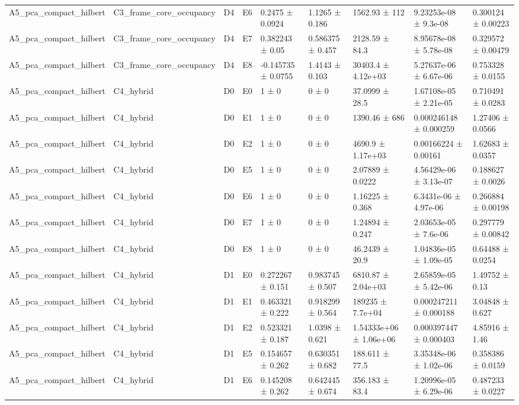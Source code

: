 \begin{table}
\begin{tabular}{lllllllll}
A5\_pca\_compact\_hilbert & C3\_frame\_core\_occupancy & D4 & E6 & 0.2475 ± 0.0924 & 1.1265 ± 0.186 & 1562.93 ± 112 & 9.23253e-08 ± 9.3e-08 & 0.300124 ± 0.00223 \\
A5\_pca\_compact\_hilbert & C3\_frame\_core\_occupancy & D4 & E7 & 0.382243 ± 0.05 & 0.586375 ± 0.457 & 2128.59 ± 84.3 & 8.95678e-08 ± 5.78e-08 & 0.329572 ± 0.00479 \\
A5\_pca\_compact\_hilbert & C3\_frame\_core\_occupancy & D4 & E8 & -0.145735 ± 0.0755 & 1.4143 ± 0.103 & 30403.4 ± 4.12e+03 & 5.27637e-06 ± 6.67e-06 & 0.753328 ± 0.0155 \\
A5\_pca\_compact\_hilbert & C4\_hybrid & D0 & E0 & 1 ± 0 & 0 ± 0 & 37.0999 ± 28.5 & 1.67108e-05 ± 2.21e-05 & 0.710491 ± 0.0283 \\
A5\_pca\_compact\_hilbert & C4\_hybrid & D0 & E1 & 1 ± 0 & 0 ± 0 & 1390.46 ± 686 & 0.000246148 ± 0.000259 & 1.27406 ± 0.0566 \\
A5\_pca\_compact\_hilbert & C4\_hybrid & D0 & E2 & 1 ± 0 & 0 ± 0 & 4690.9 ± 1.17e+03 & 0.00166224 ± 0.00161 & 1.62683 ± 0.0357 \\
A5\_pca\_compact\_hilbert & C4\_hybrid & D0 & E5 & 1 ± 0 & 0 ± 0 & 2.07889 ± 0.0222 & 4.56429e-06 ± 3.13e-07 & 0.188627 ± 0.0026 \\
A5\_pca\_compact\_hilbert & C4\_hybrid & D0 & E6 & 1 ± 0 & 0 ± 0 & 1.16225 ± 0.368 & 6.3431e-06 ± 4.97e-06 & 0.266884 ± 0.00198 \\
A5\_pca\_compact\_hilbert & C4\_hybrid & D0 & E7 & 1 ± 0 & 0 ± 0 & 1.24894 ± 0.247 & 2.03653e-05 ± 7.6e-06 & 0.297779 ± 0.00842 \\
A5\_pca\_compact\_hilbert & C4\_hybrid & D0 & E8 & 1 ± 0 & 0 ± 0 & 46.2439 ± 20.9 & 1.04836e-05 ± 1.09e-05 & 0.64488 ± 0.0254 \\
A5\_pca\_compact\_hilbert & C4\_hybrid & D1 & E0 & 0.272267 ± 0.151 & 0.983745 ± 0.507 & 6810.87 ± 2.04e+03 & 2.65859e-05 ± 5.42e-06 & 1.49752 ± 0.13 \\
A5\_pca\_compact\_hilbert & C4\_hybrid & D1 & E1 & 0.463321 ± 0.222 & 0.918299 ± 0.564 & 189235 ± 7.7e+04 & 0.000247211 ± 0.000188 & 3.04848 ± 0.627 \\
A5\_pca\_compact\_hilbert & C4\_hybrid & D1 & E2 & 0.523321 ± 0.187 & 1.0398 ± 0.621 & 1.54333e+06 ± 1.06e+06 & 0.000397447 ± 0.000403 & 4.85916 ± 1.46 \\
A5\_pca\_compact\_hilbert & C4\_hybrid & D1 & E5 & 0.154657 ± 0.262 & 0.630351 ± 0.682 & 188.611 ± 77.5 & 3.35348e-06 ± 1.02e-06 & 0.358386 ± 0.0159 \\
A5\_pca\_compact\_hilbert & C4\_hybrid & D1 & E6 & 0.145208 ± 0.262 & 0.642445 ± 0.674 & 356.183 ± 83.4 & 1.20996e-05 ± 6.29e-06 & 0.487233 ± 0.0227 \\

\end{tabular}
\end{table}
